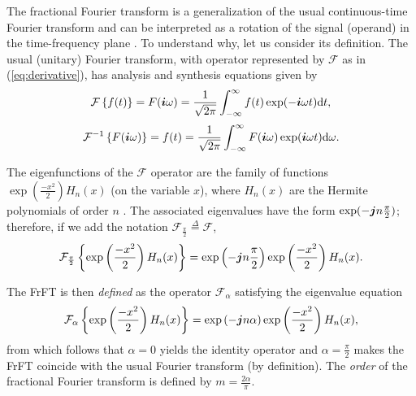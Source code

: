 The fractional Fourier transform is a generalization of the usual continuous-time Fourier transform and can be interpreted as a rotation of the signal (operand) in the time-frequency plane \cite{almeida1994fractional}. To understand why, let us consider its definition. The usual (unitary) Fourier transform, with operator represented by $\mathcal{F}$ as in (\ref{eq:derivative}), has analysis and synthesis equations given by
\begin{equation}
\mathcal{F}\left\{ f(t) \right\} = F(\boldsymbol{i} \omega) = \frac{1}{\sqrt{2 \pi}} \int_{-\infty}^{\infty} f(t) \exp(-\boldsymbol{i} \omega t) \mathrm{d}t,
\end{equation}
\begin{equation}
\mathcal{F}^{-1}\left\{ F(\boldsymbol{i} \omega) \right\} = f(t) = \frac{1}{\sqrt{2 \pi}} \int_{-\infty}^{\infty} F(\boldsymbol{i} \omega) \exp(\boldsymbol{i} \omega t) \mathrm{d}\omega.
\end{equation}

The eigenfunctions of the $\mathcal{F}$ operator are the family of functions $\exp (\frac{-x^2}{2}) H_n(x)$ (on the variable $x$), where $H_n(x)$ are the Hermite polynomials of order $n$ \cite{namias1980fractional}. The associated eigenvalues have the form $\exp(- \boldsymbol{j} n \frac{\pi}{2})$; therefore, if we add the notation $\mathcal{F}_{\frac{\pi}{2}} \overset{\Delta}{=} \mathcal{F}$,
\begin{equation}
\label{eq:eighermite}
\mathcal{F}_{\frac{\pi}{2}} \left\{ \exp \left(\frac{-x^2}{2}\right) H_n(x) \right\} = 
\exp\left(- \boldsymbol{j} n \frac{\pi}{2}\right)
\exp \left(\frac{-x^2}{2}\right) H_n(x).
\end{equation}

The FrFT is then \textit{defined} as the operator $\mathcal{F}_\alpha$ satisfying the eigenvalue equation
\begin{equation}
\label{eq:frftdef}
\mathcal{F}_{\alpha} \left\{ \exp \left(\frac{-x^2}{2}\right) H_n(x) \right\} = 
\exp\left(- \boldsymbol{j} n \alpha\right)
\exp \left(\frac{-x^2}{2}\right) H_n(x),
\end{equation}
from which follows that $\alpha = 0$ yields the identity operator and $\alpha = \frac{\pi}{2}$ makes the FrFT coincide with the usual Fourier transform (by definition). The \textit{order} of the fractional Fourier transform is defined by $m = \frac{2\alpha}{\pi}$.

